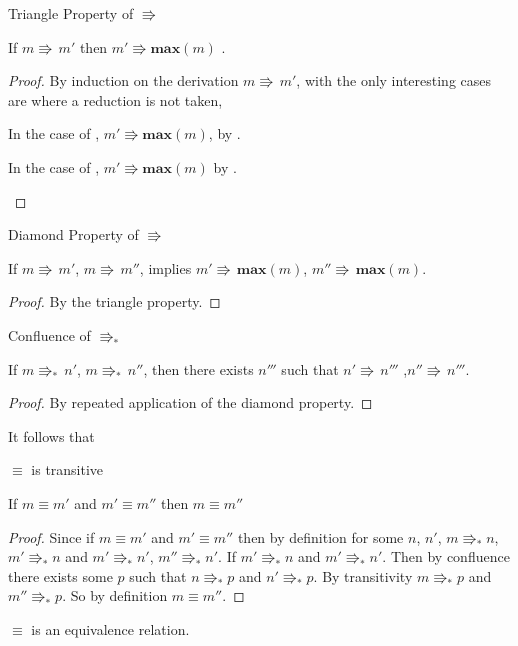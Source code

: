  
\begin{lem}
Triangle Property of $\Rrightarrow$
 
If $m\Rrightarrow\,m'$ then $m'\Rrightarrow \textbf{max}\left(m\right)$ .
\end{lem}
 
\begin{proof}
By induction on the derivation $m\Rrightarrow\,m'$, with the only interesting cases are where a reduction is not taken,
\begin{casenv}
\item In the case of , $m'\Rrightarrow \textbf{max}\left(m\right)$, by .
\item In the case of , $m'\Rrightarrow \textbf{max}\left(m\right)$ by .
\end{casenv}
\end{proof}
\begin{lem}
Diamond Property of $\Rrightarrow$
 
If $m\Rrightarrow\,m'$, $m\Rrightarrow\,m''$, implies $m'\Rrightarrow\,\textbf{max}\left(m\right)$, $m''\Rrightarrow\,\textbf{max}\left(m\right)$.
\end{lem}
 
\begin{proof}
By the triangle property.
\end{proof}
\begin{thm}
Confluence of $\Rrightarrow_{\ast}$
 
If $m\Rrightarrow_{\ast}\,n'$, $m\Rrightarrow_{\ast}\,n''$, then there exists $n'''$ such that $n'\Rrightarrow\,n'''$ ,$n''\Rrightarrow\,n'''$.
\end{thm}
 
\begin{proof}
By repeated application of the diamond property.
\end{proof}
It follows that
\begin{thm}
$\equiv$ is transitive
 
If $m\equiv m'$ and $m'\equiv m''$ then $m\equiv m''$
\end{thm}
 
\begin{proof}
Since if $m\equiv m'$ and $m'\equiv m''$ then by definition for some $n$, $n'$, $m\Rrightarrow_{\ast}n$, $m'\Rrightarrow_{\ast}n$ and $m'\Rrightarrow_{\ast}n'$, $m''\Rrightarrow_{\ast}n'$. If $m'\Rrightarrow_{\ast}n$ and $m'\Rrightarrow_{\ast}n'$.
Then by confluence there exists some $p$ such that $n\Rrightarrow_{\ast}p$ and $n'\Rrightarrow_{\ast}p$.
By transitivity $m\Rrightarrow_{\ast}p$ and $m''\Rrightarrow_{\ast}p$.
So by definition $m\equiv m''$.
\end{proof}
\begin{fact}
$\equiv$ is an equivalence relation.
\end{fact}
 
